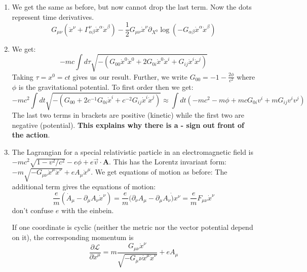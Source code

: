 \documentclass[11pt, class=article, crop=false]{standalone}
\begin{document}
\begin{enumerate}
		\item We get the same as before, but now cannot drop the last term. Now the dots represent time derivatives.
		\begin{equation}
			 G_{\mu \nu} (\ddot x^\nu + \Gamma^\nu_{\alpha \beta} \dot x^\alpha \dot x^\beta) - \frac12 G_{\mu \nu} \dot x^\nu \partial_{X^0} \log(-G_{\alpha \beta} \dot x^\alpha \dot x^\beta)
		\end{equation}
		
		\item We get: 
		\begin{equation}
			-m c \int d\tau \sqrt{-(G_{00} \dot x^0 \dot x^0 + 2 G_{0i} \dot x^0 \dot x^i + G_{ij} \dot x^i \dot x^j)}
		\end{equation}
		Taking $\tau = x^0 = ct$ gives us our result. Further, we write $G_{00} = -1 - \frac{2 \phi}{c^2}$ where $\phi$ is the gravitational potential. To first order then we get:
		\begin{equation}
			-m c^2 \int dt \sqrt{-(G_{00} + 2 c^{-1} G_{0i} \dot x^i +  c^{-2} G_{ij} \dot x^i \dot x^j)} \approx  \int dt \left(- m c^2 - m \phi  + m c G_{0 i} v^i +  m G_{ij} v^i v^j\right)
		\end{equation}
		The last two terms in brackets are positive (kinetic) while the first two are negative (potential). \textbf{This explains why there is a - sign out front of the action}.
		
		\item The Lagrangian for a special relativistic particle in an electromagnetic field is $-mc^2 \sqrt{1-v^2/c^2} - e \phi + e \vec v \cdot \mathbf{A}$. This has the Lorentz invariant form: $-m \sqrt{-G_{\mu \nu} \dot x^\mu \dot x^\nu} + e A_\mu \dot x^\mu$. We get equations of motion as before: 
		The additional term gives the equations of motion:
		\begin{equation}
			\frac{e}{m} (\dot A_\mu - \partial_\mu A_\nu \dot x^\nu) =  \frac{e}{m} (\partial_\nu A_\mu - \partial_\mu A_\nu \dot) x^\nu =  \frac{e}{m} F_{\mu \nu} \dot x^\nu
		\end{equation}
		don't confuse $e$ with the einbein. 
		
		If one coordinate is cyclic (neither the metric nor the vector potential depend on it), the corresponding momentum is 
		\begin{equation}
			\frac{\partial \mathcal L}{\partial \dot x^\mu} = m\frac{G_{\mu \nu} \dot x^\nu}{\sqrt{-G_\mu \nu \dot x^\mu \dot x^\nu}} + e A_\mu
		\end{equation}
		

\end{enumerate}
\end{document}
